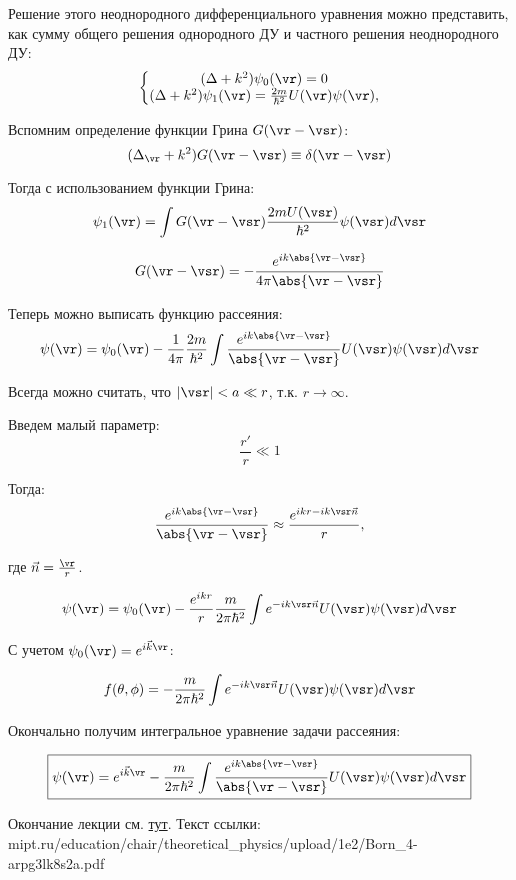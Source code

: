 Решение этого неоднородного дифференциального уравнения можно представить, как сумму общего решения однородного ДУ и частного решения неоднородного ДУ:
$$
\left \{  
\begin{matrix}
(\Delta + k^2) \psi_0(\vr) = 0\\
(\Delta + k^2) \psi_1(\vr) = \frac{2m}{\hbar^2}U(\vr)\psi(\vr),
\end{matrix}
\right .
$$

Вспомним определение функции Грина $G(\vr - \vsr)$:
\begin{equation}
\label{eq:19_3_1}
(\Delta_{\vr} + k^2)G(\vr - \vsr) \equiv \delta(\vr - \vsr)
\end{equation}

Тогда с использованием функции Грина:
$$
\psi_1(\vr) = \int G(\vr - \vsr) \frac{2mU(\vsr)}{\hbar^2} \psi(\vsr) d\vsr
$$

$$
G(\vr - \vsr) = - \frac{e^{ik\abs{\vr - \vsr}}}{4\pi\abs{\vr - \vsr}}
$$

Теперь можно выписать функцию рассеяния:
$$
\psi(\vr) = \psi_0(\vr) - \frac{1}{4 \pi}\frac{2m}{\hbar^2}\int \frac{e^{ik\abs{\vr - \vsr}}}{\abs{\vr - \vsr}} U(\vsr)\psi(\vsr)d\vsr
$$

Всегда можно считать, что $|\vsr| < a \ll r$, т.к. $r \to \infty$.

Введем малый параметр:
$$
\frac{r'}{r} \ll 1
$$

Тогда:
$$
\frac{e^{ik\abs{\vr - \vsr}}}{\abs{\vr - \vsr}} \approx \frac{e^{ikr - ik\vsr \vec{n}}}{r},
$$

где $\vec{n} = \frac{\vr}{r}$.

$$
\psi(\vr) = \psi_0(\vr) - \frac{e^{ikr}}{r}\frac{m}{2\pi\hbar^2}\int e^{- ik\vsr \vec{n}} U(\vsr)\psi(\vsr)d\vsr
$$

С учетом $\psi_0(\vr) = e^{i\vec{k}\vr}$:

$$
f(\theta, \phi) =  - \frac{m}{2\pi\hbar^2}\int e^{- ik\vsr \vec{n}} U(\vsr)\psi(\vsr)d\vsr
$$

Окончально получим интегральное уравнение задачи рассеяния:

\begin{equation}
\label{eq:19_3_2}
\boxed{\psi(\vr) = e^{i\vec{k}\vr} - \frac{m}{2\pi\hbar^2}\int \frac{e^{ik\abs{\vr - \vsr}}}{\abs{\vr - \vsr}} U(\vsr)\psi(\vsr)d\vsr}
\end{equation}

Окончание лекции см. \href{http://mipt.ru/education/chair/theoretical_physics/upload/1e2/Born_4-arpg3lk8s2a.pdf}{тут}. Текст ссылки: \\
mipt.ru/education/chair/theoretical\_physics/upload/1e2/Born\_4-arpg3lk8s2a.pdf
